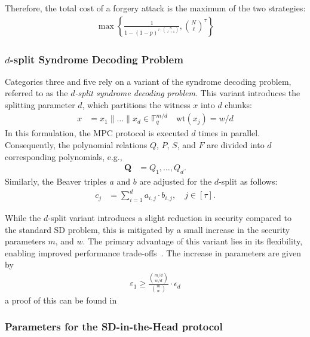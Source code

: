 \documentclass[11pt]{report}
\theoremstyle{definition}
\theoremstyle{plain}
\begin{document}
Therefore, the total cost of a forgery attack is the maximum of the two strategies:
\begin{align}
  \max \left\{ \frac{1}{1 - (1-p)^{\tau \cdot \binom{N}{\ell + 1}}}, \binom{N}{\ell}^\tau \right\}\label{eq:forgery_attack_cost}
\end{align}

\subsubsection{$d$-split Syndrome Decoding Problem}

Categories three and five rely on a variant of the syndrome decoding problem, referred to as the \textit{$d$-split syndrome decoding problem}. This variant introduces the splitting parameter $d$, which partitions the witness $x$ into $d$ chunks:
\begin{align*}
  x & = x_1 \| \dots \| x_d \in \mathbb{F}_q^{m/d} \quad \text{wt}(x_j) = w/d
\end{align*}
In this formulation, the MPC protocol is executed $d$ times in parallel. Consequently, the polynomial relations $Q$, $P$, $S$, and $F$ are divided into $d$ corresponding polynomials, e.g.,
\begin{align*}
  \textbf{Q} & = Q_1, \dots, Q_d.
\end{align*}
Similarly, the Beaver triples $a$ and $b$ are adjusted for the $d$-split as follows:
\begin{align*}
  c_j & = \sum_{i=1}^d a_{i,j} \cdot b_{i,j}, \quad j \in [\tau].
\end{align*}

While the $d$-split variant introduces a slight reduction in security compared to the standard SD problem, this is mitigated by a small increase in the security parameters $m$, and $w$. The primary advantage of this variant lies in its flexibility, enabling improved performance trade-offs~\cite{aguilarsyndrome11}. The increase in parameters are given by
\begin{align}
  \varepsilon_1 \geq \frac{\binom{m/d}{w/d}}{\binom{m}{w}} \cdot \epsilon_d\label{eq:d_split_epsilon}
\end{align}
a proof of this can be found in~\cite[p27]{feneuil2022syndrome}

\subsubsection{Parameters for the SD-in-the-Head protocol}
\end{document}
